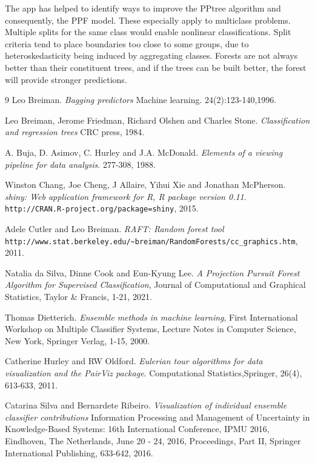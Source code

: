 \documentclass[10pt, legalpaper, twoside]{article}\usepackage[]{graphicx}\usepackage[]{color}
\begin{document}
The app has helped to identify ways to improve the  PPtree algorithm and consequently, the PPF model. These especially apply to multiclass problems. Multiple splits for the same class would enable nonlinear classifications. Split criteria tend to place boundaries too close to some groups, due to heteroskedasticity being induced by aggregating classes. Forests are not always better than their constituent trees, and if the trees can be built better, the forest will provide stronger predictions.


\begin{thebibliography}{9}
Leo Breiman.
\textit{Bagging predictors}
Machine learning.
24(2):123-140,1996.

Leo Breiman, Jerome Friedman, Richard Olshen  and Charles Stone.
\textit{Classification and regression trees}
CRC press,
1984.

A. Buja, D. Asimov, C. Hurley and J.A. McDonald.
\textit{Elements of a viewing pipeline for data analysis}.
277-308, 1988.

Winston Chang,  Joe Cheng, J Allaire, Yihui Xie and Jonathan McPherson.
\textit{shiny: Web application framework for R, R package version 0.11}.
\\\texttt{http://CRAN.R-project.org/package=shiny},
2015.

 Adele Cutler and Leo Breiman.
\textit{RAFT: Random forest tool}
\\\texttt{http://www.stat.berkeley.edu/\~{}breiman/RandomForests/cc\_graphics.htm},
2011.

Natalia da Silva, Dinne Cook and Eun-Kyung Lee.
\textit{A Projection Pursuit Forest Algorithm for Supervised Classification},
Journal of Computational and Graphical Statistics, Taylor \& Francis, 1-21, 2021.


  Thomas Dietterich.
\textit{Ensemble methods in machine learning},
First International Workshop on Multiple Classifier Systems, Lecture Notes in Computer Science, New York, Springer Verlag, 1-15, 2000.


Catherine Hurley and RW Oldford.
\textit{Eulerian tour algorithms for data visualization and the PairViz package}.
Computational Statistics,Springer, 26(4), 613-633, 2011.


Catarina Silva and Bernardete Ribeiro.
\textit{Visualization of individual ensemble classifier contributions}
Information Processing and Management of Uncertainty in Knowledge-Based Systems: 16th International Conference, IPMU 2016, Eindhoven, The Netherlands, June 20 - 24, 2016, Proceedings, Part II, Springer International Publishing, 633-642, 2016.


\end{thebibliography}
\end{document}
